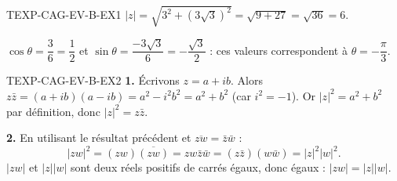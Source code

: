 \begin{corrige}{TEXP-CAG-EV-B-EX1}
$|z| = \sqrt{3^2+(3\sqrt3)^2} = \sqrt{9+27} = \sqrt{36} = 6$.

$\cos\theta = \dfrac{3}{6}=\dfrac{1}{2}$ et $\sin\theta = \dfrac{-3\sqrt3}{6}=-\dfrac{\sqrt3}{2}$ : ces valeurs correspondent à $\theta=-\dfrac{\pi}{3}$.
\end{corrige}

\begin{corrige}{TEXP-CAG-EV-B-EX2}
\textbf{1.} Écrivons $z=a+ib$. Alors $z\bar z = (a+ib)(a-ib) = a^2-i^2b^2 = a^2+b^2$ (car $i^2=-1$). Or $|z|^2=a^2+b^2$ par définition, donc $|z|^2=z\bar z$.

\textbf{2.} En utilisant le résultat précédent et $\overline{zw}=\bar z\bar w$ :
\[
  |zw|^2 = (zw)\overline{(zw)} = zw\bar z\bar w = (z\bar z)(w\bar w) = |z|^2|w|^2.
\]
$|zw|$ et $|z||w|$ sont deux réels positifs de carrés égaux, donc égaux : $|zw|=|z||w|$.
\end{corrige}

